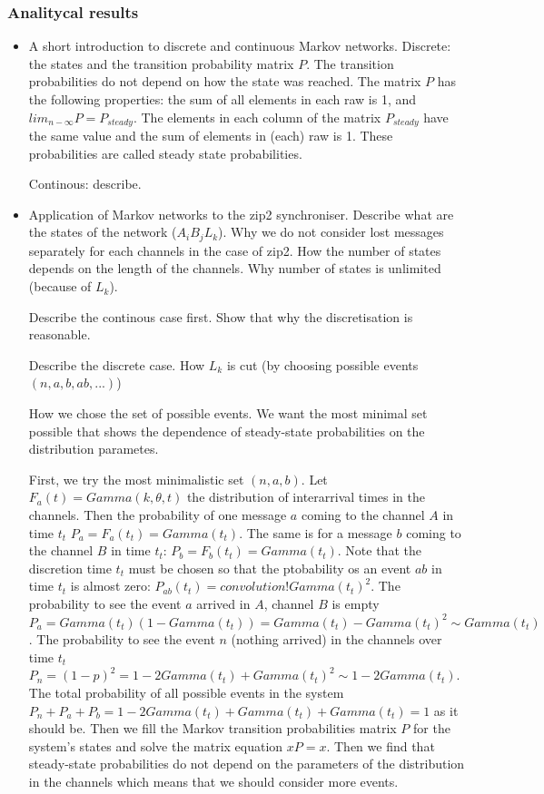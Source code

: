     \subsubsection{Analitycal results}
    \begin{itemize}
    \item A short introduction to discrete and continuous Markov networks.
Discrete: the states and the transition probability matrix $P$. The transition probabilities do not depend on how the state was reached. The matrix $P$ has the following properties: the sum of all elements in each raw is 1, and $lim_{n - \infty} P = P_{steady}$. The elements in each column of the matrix $P_{steady}$ have the same value and the sum of elements in (each) raw is 1. These probabilities are called steady state probabilities.

Continous: describe.
    \item Application of Markov networks to the zip2 synchroniser.
Describe what are the states of the network ($A_{i} B_{j} L_{k}$). Why we do not consider lost messages separately for each channels in the case of zip2. How the number of states depends on the length of the channels. Why number of states is unlimited (because of $L_{k}$).

Describe the continous case first. Show that why the discretisation is reasonable.

Describe the discrete case. How $L_{k}$ is cut (by choosing possible events $(n,a,b,ab,...)$)

How we chose the set of possible events. We want the most minimal set possible that shows the dependence of steady-state probabilities on the distribution parametes.

First, we try the most minimalistic set $(n,a,b)$. Let $F_{a}(t) = Gamma(k, \theta, t)$ the distribution of interarrival times in the channels. Then the probability of one message $a$ coming to the channel $A$ in time $t_{t}$ $P_{a} = F_{a}(t_{t}) = Gamma(t_{t})$. The same is for a message $b$ coming to the channel $B$ in time $t_{t}$: $P_{b} = F_{b}(t_{t}) = Gamma(t_{t})$. Note that the discretion time $t_{t}$ must be chosen so that the ptobability os an event $ab$ in time $t_{t}$ is almost zero: $P_{ab}(t_{t}) = convolution! Gamma(t_{t})^2$. The probability to see the event $a$ arrived in $A$, channel $B$ is empty $P_{a} = Gamma(t_{t})(1-Gamma(t_{t})) = Gamma(t_{t}) - Gamma(t_{t})^2 \sim Gamma(t_{t})$. The probability to see the event $n$ (nothing arrived) in the channels over time $t_{t}$ $P_{n} = (1-p)^2 = 1 - 2 Gamma(t_{t}) + Gamma(t_{t})^2 \sim 1 - 2 Gamma(t_{t})$. The total probability of all possible events in the system $P_{n} + P_{a} + P_{b} = 1 - 2 Gamma(t_{t}) + Gamma(t_{t}) + Gamma(t_{t}) = 1$ as it should be. Then we fill the Markov transition probabilities matrix $P$ for the system's states and solve the matrix equation $xP = x$. Then we find that steady-state probabilities do not depend on the parameters of the distribution in the channels which means that we should consider more events.


\end{itemize}
